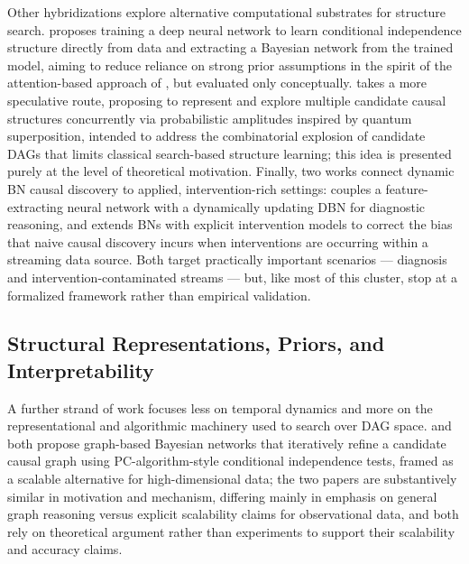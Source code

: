 Other hybridizations explore alternative computational substrates for structure search. \cite{zhang2026causalo} proposes training a deep neural network to learn conditional independence structure directly from data and extracting a Bayesian network from the trained model, aiming to reduce reliance on strong prior assumptions in the spirit of the attention-based approach of \cite{nauta2019causal}, but evaluated only conceptually. \cite{zhang2026quantum} takes a more speculative route, proposing to represent and explore multiple candidate causal structures concurrently via probabilistic amplitudes inspired by quantum superposition, intended to address the combinatorial explosion of candidate DAGs that limits classical search-based structure learning; this idea is presented purely at the level of theoretical motivation. Finally, two works connect dynamic BN causal discovery to applied, intervention-rich settings: \cite{zhang2026neuro} couples a feature-extracting neural network with a dynamically updating DBN for diagnostic reasoning, and \cite{zhang2026causall} extends BNs with explicit intervention models to correct the bias that naive causal discovery incurs when interventions are occurring within a streaming data source. Both target practically important scenarios --- diagnosis and intervention-contaminated streams --- but, like most of this cluster, stop at a formalized framework rather than empirical validation.

\subsection{Structural Representations, Priors, and Interpretability}
A further strand of work focuses less on temporal dynamics and more on the representational and algorithmic machinery used to search over DAG space. \cite{zhang2026graph} and \cite{zhang2026graphb} both propose graph-based Bayesian networks that iteratively refine a candidate causal graph using PC-algorithm-style conditional independence tests, framed as a scalable alternative for high-dimensional data; the two papers are substantively similar in motivation and mechanism, differing mainly in emphasis on general graph reasoning versus explicit scalability claims for observational data, and both rely on theoretical argument rather than experiments to support their scalability and accuracy claims.

